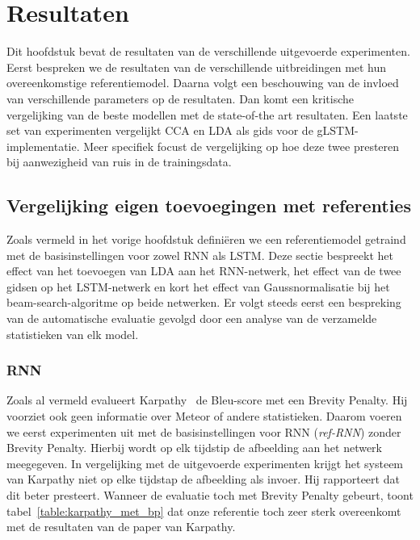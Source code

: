 \chapter{Resultaten} %
\label{cha:resultaten}
Dit hoofdstuk bevat de resultaten van de verschillende uitgevoerde experimenten. Eerst bespreken we de resultaten van de verschillende uitbreidingen met hun overeenkomstige referentiemodel. Daarna volgt een beschouwing van de invloed van verschillende parameters op de resultaten. Dan komt een kritische vergelijking van de beste modellen met de state-of-the art resultaten. Een laatste set van experimenten vergelijkt CCA en LDA als gids voor de gLSTM-implementatie. Meer specifiek focust de vergelijking op hoe deze twee presteren bij aanwezigheid van ruis in de trainingsdata.

\section{Vergelijking eigen toevoegingen met referenties}  %
\label{sec:eigen_implementaties}
Zoals vermeld in het vorige hoofdstuk defini\"eren we een referentiemodel getraind met de basisinstellingen voor zowel RNN als LSTM. Deze sectie bespreekt het effect van het toevoegen van LDA aan het RNN-netwerk, het effect van de twee gidsen op het LSTM-netwerk en kort het effect van Gaussnormalisatie bij het beam-search-algoritme op beide netwerken. Er volgt steeds eerst een bespreking van de automatische evaluatie gevolgd door een analyse van de verzamelde statistieken van elk model.

\subsection{RNN}
Zoals al vermeld evalueert Karpathy~\cite{Karpathy2015} de Bleu-score met een Brevity Penalty. Hij voorziet ook geen informatie over Meteor of andere statistieken. Daarom voeren we eerst experimenten uit met de basisinstellingen voor RNN (\emph{ref-RNN}) zonder Brevity Penalty. Hierbij wordt op elk tijdstip de afbeelding aan het netwerk meegegeven. In vergelijking met de uitgevoerde experimenten krijgt het systeem van Karpathy niet op elke tijdstap de afbeelding als invoer. Hij rapporteert dat dit beter presteert. Wanneer de evaluatie toch met Brevity Penalty gebeurt, toont tabel~\ref{table:karpathy_met_bp} dat onze referentie toch zeer sterk overeenkomt met de resultaten van de paper van Karpathy. 

